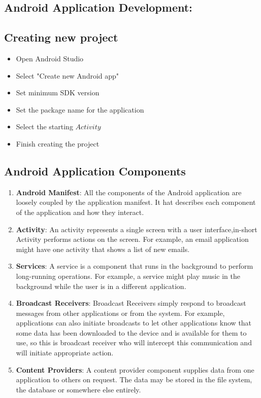 \documentclass{article}
\begin{document}
\subsection{Android Application Development:}    
	\subsection {Creating new project}
    	\begin{itemize}
			\item Open Android Studio
        	\item Select "Create new Android app"
	        \item Set minimum SDK version
	        \item Set the package name for the application
	        \item Select the starting $Activity$
	        \item Finish creating the project
		\end{itemize}  
    \subsection {Android Application Components}
        \begin{enumerate}
        	\item \textbf{Android Manifest}: All the components of the Android application are loosely coupled by the application manifest. It hat describes each component of the application and how they interact.
			\item \textbf{Activity}: An activity represents a single screen with a user interface,in-short Activity performs actions on the screen. For example, an email application might have one activity that shows a list of new emails.
            \item \textbf{Services}: A service is a component that runs in the background to perform long-running operations. For example, a service might play music in the background while the user is in a different application.
            \item \textbf{Broadcast Receivers}: Broadcast Receivers simply respond to broadcast messages from other applications or from the system. For example, applications can also initiate broadcasts to let other applications know that some data has been downloaded to the device and is available for them to use, so this is broadcast receiver who will intercept this communication and will initiate appropriate action.
            \item \textbf{Content Providers}: A content provider component supplies data from one application to others on request. The data may be stored in the file system, the database or somewhere else entirely.
		\end{enumerate} 
\end{document}
